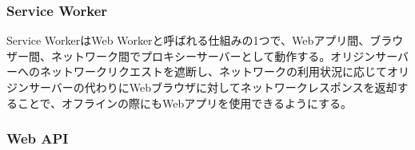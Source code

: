 \subsubsection{Service Worker}\label{subsubsection:Service Worker}
Service WorkerはWeb Workerと呼ばれる仕組みの1つで、Webアプリ間、ブラウザー間、ネットワーク間でプロキシーサーバーとして動作する。オリジンサーバーへのネットワークリクエストを遮断し、ネットワークの利用状況に応じてオリジンサーバーの代わりにWebブラウザに対してネットワークレスポンスを返却することで、オフラインの際にもWebアプリを使用できるようにする。
\subsubsection{Web API}\label{subsubsection:Web API}